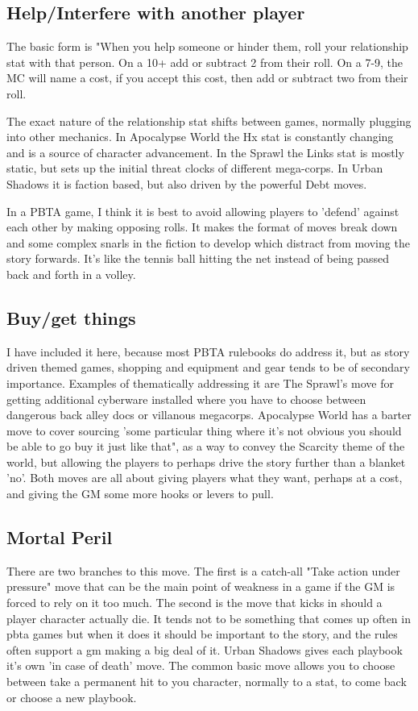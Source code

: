 \documentclass{tufte-handout}
\begin{document}
\subsection{Help/Interfere with another player}
The basic form is "When you help someone or hinder them, roll your relationship stat with that person. On a 10+ add or subtract 2 from their roll. On a 7-9, the MC will name a cost, if you accept this cost, then add or subtract two from their roll.

The exact nature of the relationship stat shifts between games, normally plugging into other mechanics. In Apocalypse World the Hx stat is constantly changing and is a source of character advancement. In the Sprawl the Links stat is mostly static, but sets up the initial threat clocks of different mega-corps. In Urban Shadows it is faction based, but also driven by the powerful Debt moves.

In a PBTA game, I think it is best to avoid allowing players to 'defend' against each other by making opposing rolls. It makes the format of moves break down and some complex snarls in the fiction to develop which distract from moving the story forwards. It's like the tennis ball hitting the net instead of being passed back and forth in a volley.

\subsection{Buy/get things}
I have included it here, because most PBTA rulebooks do address it, but as story driven themed games, shopping and equipment and gear tends to be of secondary importance. Examples of thematically addressing it are The Sprawl's move for getting additional cyberware installed where you have to choose between dangerous back alley docs or villanous megacorps. 
Apocalypse World has a barter move to cover sourcing 'some particular thing where it's not obvious you should be able to go buy it just like that", as a way to convey the Scarcity theme of the world, but allowing the players to perhaps drive the story further than a blanket 'no'. 
Both moves are all about giving players what they want, perhaps at a cost, and giving the GM some more hooks or levers to pull.

\subsection{Mortal Peril}
There are two branches to this move. The first is a catch-all "Take action under pressure" move that can be the main point of weakness in a game if the GM is forced to rely on it too much. 
The second is the move that kicks in should a player character actually die. It tends not to be something that comes up often in pbta games but when it does it should be important to the story, and the rules often support a gm making a big deal of it. Urban Shadows gives each playbook it's own 'in case of death' move. 
The common basic move allows you to choose between take a permanent hit to you character, normally to a stat, to come back or choose a new playbook. 
\end{document}
